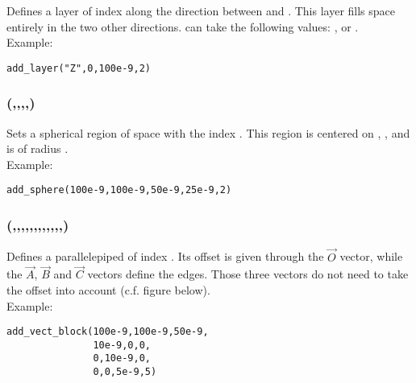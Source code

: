 Defines a layer of index  along the  direction between  and . This layer fills space entirely in the two other directions.  can take the following values: ,  or .\\ Example:
\begin{lstlisting}
add_layer("Z",0,100e-9,2)
\end{lstlisting}

\subsubsection[add\_sphere]{(,,,,)}

Sets a spherical region of space with the index . This region is centered on , ,  and is of radius . \\ Example:
\begin{lstlisting}
add_sphere(100e-9,100e-9,50e-9,25e-9,2)
\end{lstlisting}

\subsubsection[add\_vect\_block]{(,,,,,,,,,,,,)}

Defines a parallelepiped of index . Its offset is given through the $\vec O$ vector, while the $\vec A$, $\vec B$ and $\vec C$ vectors define the edges. Those three vectors do not need to take the offset into account (c.f. figure below).\\ Example:
\begin{lstlisting}
add_vect_block(100e-9,100e-9,50e-9,
               10e-9,0,0,
               0,10e-9,0,
               0,0,5e-9,5)
\end{lstlisting}
\begin{center}\end{center}


